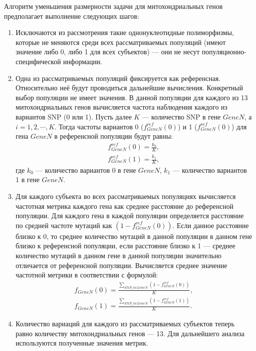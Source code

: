 Алгоритм уменьшения размерности задачи для митохондриальных генов предполагает выполнение следующих шагов:
\begin{enumerate}
	\item Исключаются из рассмотрения такие однонуклеотидные полиморфизмы, которые не меняются среди всех рассматриваемых популяций (имеют значение либо 0, либо 1 для всех субъектов) --- они не несут популяционно-специфической информации.
	\item Одна из рассматриваемых популяций фиксируется как референсная. Относительно неё будут проводиться дальнейшие вычисления. Конкретный выбор популяции не имеет значения. В данной популяции для каждого из 13 митохондриальных генов вычисляется частота наблюдения каждого из вариантов SNP (0 или 1). Пусть далее $K$ --- количество SNP в гене $Gene N$, а $i = 1, 2, \cdots, K$. Тогда частоты вариантов 0 ($f_{Gene N}^{ref} (0)$) и 1 ($f_{Gene N}^{ref} (0)$) для гена $Gene N$ в референсной популяции будут равны:
	\begin{equation}
	\label{eq:f_ref_mt}
	\begin{gathered}
	f_{Gene N}^{ref} (0) = \frac{k_0}{K},\\
	f_{Gene N}^{ref} (1) = \frac{k_1}{K},
	\end{gathered}
	\end{equation}
	где $k_0$ --- количество вариантов 0 в гене $Gene N$, $k_1$ --- количество вариантов 1 в гене $Gene N$.
	\item Для каждого субъекта во всех рассматриваемых популяциях вычисляется частотная метрика каждого гена как среднее расстояние до референсной популяции. Для каждого гена в каждой популяции определяется расстояние по средней частоте мутаций как $\left(1 - f_{Gene N}^{ref} (0)\right)$. Если данное расстояние близко к 0, то среднее количество мутаций в данной популяции в данном гене близко к референсной популяции, если расстояние близко к 1 --- среднее количество мутаций в данном гене в данной популяции значительно отличается от референсной популяции. Вычисляется среднее значение частотной метрики в соответствии с формулой:
	\begin{equation}
	\label{eq:f_mt}
		\begin{gathered}
		f_{Gene N} (0) = \frac{\sum_{SNP_i\,in\,Gene N} \left(1 - f_{Gene N}^{ref} (0)\right)}{K},\\
		f_{Gene N} (1) = \frac{\sum_{SNP_i\,in\,Gene N} \left(1 - f_{Gene N}^{ref} (1)\right)}{K}.
		\end{gathered}
	\end{equation}
	\item Количество вариаций для каждого из рассматриваемых субъектов теперь равно количеству митохондриальных генов --- 13. Для дальнейшего анализа используются полученные значения метрик.
\end{enumerate}

